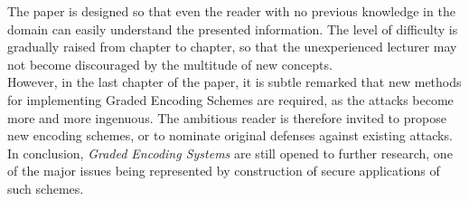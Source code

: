 The paper is designed so that even the reader with no previous knowledge in the domain can easily understand the presented information. The level of difficulty is gradually raised from chapter to chapter, so that the unexperienced lecturer may not become discouraged by the multitude of new concepts. \\

However, in the last chapter of the paper, it is subtle remarked that new methods for implementing Graded Encoding Schemes are required, as the attacks become more and more ingenuous. The ambitious reader is therefore invited to propose new encoding schemes, or to nominate original defenses against existing attacks.\\

In conclusion, \textit{Graded Encoding Systems} are still opened to further research, one of the major issues being represented by construction of secure applications of such schemes.
 